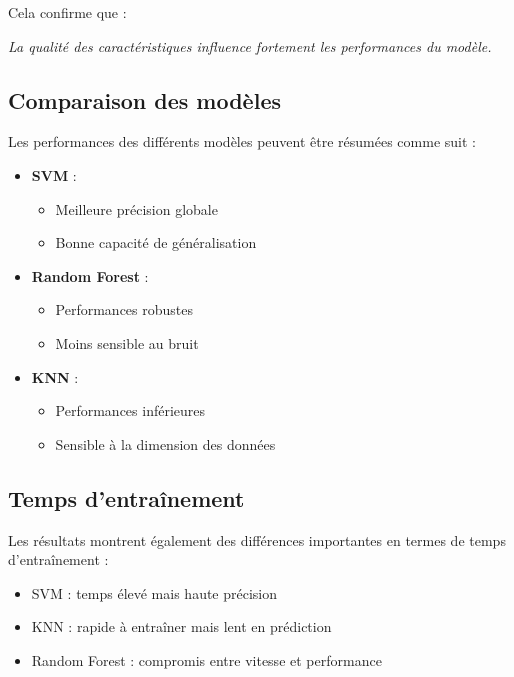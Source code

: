 \documentclass[12pt,a4paper]{article}
\begin{document}
    Cela confirme que :
    \begin{center}
    \textit{La qualité des caractéristiques influence fortement les performances du modèle.}
    \end{center}

    \subsection{Comparaison des modèles}

    Les performances des différents modèles peuvent être résumées comme suit :
    \begin{itemize}
        \item \textbf{SVM} :
        \begin{itemize}
            \item Meilleure précision globale
            \item Bonne capacité de généralisation
        \end{itemize}

        \item \textbf{Random Forest} :
        \begin{itemize}
            \item Performances robustes
            \item Moins sensible au bruit
        \end{itemize}

        \item \textbf{KNN} :
        \begin{itemize}
            \item Performances inférieures
            \item Sensible à la dimension des données
        \end{itemize}
    \end{itemize}

    \subsection{Temps d’entraînement}

    Les résultats montrent également des différences importantes en termes de temps d’entraînement :
    \begin{itemize}
        \item SVM : temps élevé mais haute précision
        \item KNN : rapide à entraîner mais lent en prédiction
        \item Random Forest : compromis entre vitesse et performance
    \end{itemize}
\end{document}
